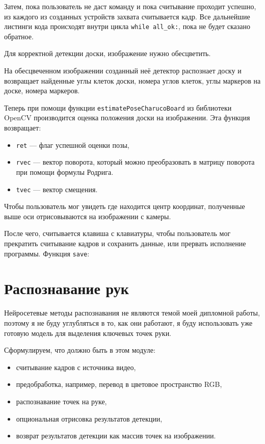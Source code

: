 \documentclass[14pt, a4paper]{extarticle}
\begin{document}
Затем, пока пользователь не даст команду и пока считывание проходит
успешно, из каждого из созданных устройств захвата считывается кадр. Все
дальнейшие листинги кода происходят внутри цикла \texttt{while all\_ok:}, пока не
будет сказано обратное.

Для корректной детекции доски, изображение нужно обесцветить.

На обесцвеченном изображении созданный неё детектор распознает доску и
возвращает найденные углы клеток доски, номера углов клеток, углы маркеров
на доске, номера маркеров.

Теперь при помощи функции \texttt{estimatePoseCharucoBoard} из библиотеки
OpenCV производится оценка положения доски на изображении. Эта функция
возвращает:
\begin{itemize}
  \item \texttt{ret} --- флаг успешной оценки позы,
  \item \texttt{rvec} --- вектор поворота, который можно преобразовать в
    матрицу поворота при помощи формулы Родрига.
  \item \texttt{tvec} --- вектор смещения.
\end{itemize}

Чтобы пользователь мог увидеть где находится центр координат, полученные
выше оси отрисовываются на изображении с камеры.

После чего, считывается клавиша с клавиатуры, чтобы пользователь мог
прекратить считывание кадров и сохранить данные, или прервать исполнение
программы.
Функция \texttt{save}:

\section{Распознавание рук}
Нейросетевые методы распознавания не являются темой моей дипломной работы,
поэтому я не буду углубляться в то, как они работают, я буду использовать уже
готовую модель для выделения ключевых точек руки.

Сформулируем, что должно быть в этом модуле:
\begin{itemize}
  \item считывание кадров с источника видео,
  \item предобработка, например, перевод в цветовое пространство RGB,
  \item распознавание точек на руке,
  \item опциональная отрисовка результатов детекции,
  \item возврат результатов детекции как массив точек на изображении.
\end{itemize}
\end{document}
